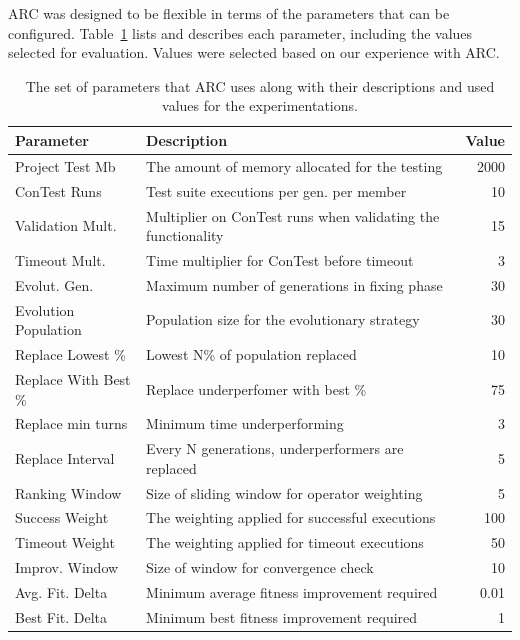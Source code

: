 \documentclass{llncs}
\begin{document}
ARC was designed to be flexible in terms of the parameters that can be
configured. Table~\ref{tbl:used_parameters} lists and describes each parameter,
including the values selected for evaluation. Values were selected based on our
experience with ARC.


\begin{table}%
\caption{The set of parameters that ARC uses along with their descriptions and
used values for the experimentations.}
\begin{center}
\lstset{basicstyle=\scriptsize}
\begin{tabular}{|p{3cm}|p{10cm}|r|}
\hline
\textbf{Parameter} & \textbf{Description} & \textbf{Value}\\
\hline
Project Test Mb & The amount of memory allocated for the testing & 2000\\
\hline
ConTest Runs & Test suite executions per gen. per member & 10\\
\hline
Validation Mult. & Multiplier on ConTest runs when validating the functionality & 15\\
\hline
Timeout Mult. & Time multiplier for ConTest before timeout & 3\\
\hline
Evolut. Gen. & Maximum number of generations in fixing phase & 30\\
\hline
Evolution Population & Population size for the evolutionary strategy & 30\\
\hline
Replace Lowest \% & Lowest N\% of population replaced & 10\\
\hline
Replace With Best \% & Replace underperfomer with best \% & 75\\
\hline
Replace min turns & Minimum time underperforming & 3\\
\hline
Replace Interval & Every N generations, underperformers are replaced & 5\\
\hline
Ranking Window & Size of sliding window for operator weighting & 5\\
\hline
Success Weight & The weighting applied for successful executions & 100\\
\hline
Timeout Weight & The weighting applied for timeout executions & 50\\
\hline
Improv. Window & Size of window for convergence check & 10\\
\hline
Avg. Fit. Delta & Minimum average fitness improvement required & 0.01\\
\hline
Best Fit. Delta & Minimum best fitness improvement required & 1\\
\hline
\end{tabular}
\label{tbl:used_parameters}
\end{center}
\end{table}
\end{document}
